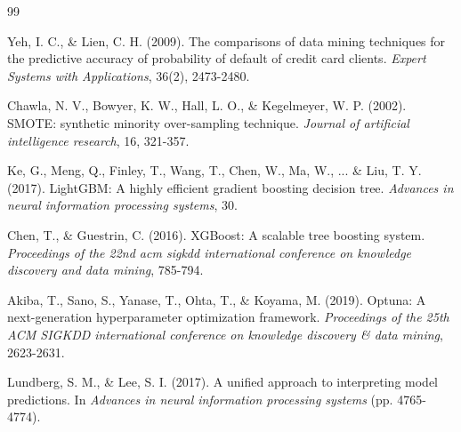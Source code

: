 \documentclass[a4paper, 12pt]{report}
\begin{document}






\begin{thebibliography}{99}

Yeh, I. C., \& Lien, C. H. (2009). The comparisons of data mining techniques for the predictive accuracy of probability of default of credit card clients. \textit{Expert Systems with Applications}, 36(2), 2473-2480.

Chawla, N. V., Bowyer, K. W., Hall, L. O., \& Kegelmeyer, W. P. (2002). SMOTE: synthetic minority over-sampling technique. \textit{Journal of artificial intelligence research}, 16, 321-357.

Ke, G., Meng, Q., Finley, T., Wang, T., Chen, W., Ma, W., ... \& Liu, T. Y. (2017). LightGBM: A highly efficient gradient boosting decision tree. \textit{Advances in neural information processing systems}, 30.

Chen, T., \& Guestrin, C. (2016). XGBoost: A scalable tree boosting system. \textit{Proceedings of the 22nd acm sigkdd international conference on knowledge discovery and data mining}, 785-794.

Akiba, T., Sano, S., Yanase, T., Ohta, T., \& Koyama, M. (2019). Optuna: A next-generation hyperparameter optimization framework. \textit{Proceedings of the 25th ACM SIGKDD international conference on knowledge discovery \& data mining}, 2623-2631.

Lundberg, S. M., \& Lee, S. I. (2017). A unified approach to interpreting model predictions. In \textit{Advances in neural information processing systems} (pp. 4765-4774).

\end{thebibliography}
\end{document}
